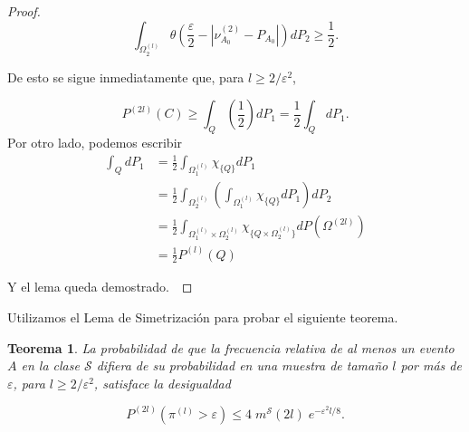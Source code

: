 \documentclass{report}
\newtheorem{thm}{Teorema}[section]
\begin{document}
\begin{proof}
\[
\int_{\Omega_2^{(l)}} \theta \left( \frac{\varepsilon}{2} - \left| \nu^{(2)}_{A_0} - P_{A_0} \right| \right) dP_2 \geq \frac{1}{2}.
\]

De esto se sigue inmediatamente que, para \( l \geq 2 / \varepsilon^2 \),

\[
P^{(2l)}(C) \geq \int_{Q} \left( \frac{1}{2} \right) dP_1  =
 \frac{1}{2} \int_{Q} dP_1.
\]
Por otro lado, podemos escribir
\begin{equation*}
 \begin{split}
   \int_{Q}dP_1 & = \frac{1}{2} \int_{\Omega_1^{(l)}} \chi_{\{Q\}}dP_1 \\
   &=\frac{1}{2}  \int_{\Omega_2^{(l)}}\left(\int_{\Omega_1^{(l)}} \chi_{\{Q\}}dP_1\right) dP_2 \\
   &=\frac{1}{2}  \int_{\Omega_1^{(l)}\times\Omega_2^{(l)}}  \chi_{\{Q\times \Omega_2^{(l)}\}} dP(\Omega^{(2l)}) \\
   &=\frac{1}{2}  P^{(l)}(Q)
\end{split}   
\end{equation*}

Y el lema queda demostrado.\



\end{proof}







Utilizamos el Lema de Simetrización para probar el siguiente teorema.\newline

\begin{thm}
    La probabilidad de que la frecuencia relativa de al menos un evento $A$ en la clase \( \mathcal{S} \) difiera de su probabilidad en una 
    muestra de tamaño \( l \) por más de \( \varepsilon \), para \( l \geq 2 / \varepsilon^2 \), satisface la desigualdad  

    \[
    P^{(2l)}\left(\pi^{(l)} > \varepsilon\right) \leq 4 \; m^{\mathcal{S}}(2l) \; e^{-\varepsilon^2 l/8}.
    \]  
\end{thm}
\end{document}
